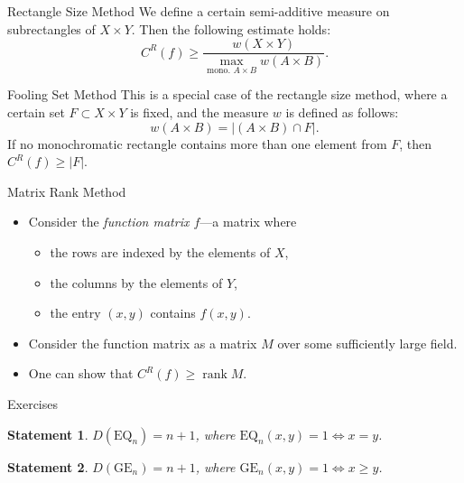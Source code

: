 \documentclass[aspectratio=169]{beamer}
\newcommand{\pitem}{\pause\item}
\newtheorem{statement}{Statement}
\DeclareMathOperator{\rank}{rank}
\begin{document}
\begin{frame}{Rectangle Size Method}
    We define a certain semi-additive measure on subrectangles of $X \times Y$. Then the following estimate holds:
    \[
    C^R(f) \ge \frac{w(X \times Y)}{\max\limits_{\text{mono. } A \times B} w(A \times B)}.
    \]

    \pause
    \begin{block}{Fooling Set Method}
        This is a special case of the rectangle size method, where a certain set $F \subset X \times Y$ is fixed, and the measure $w$ is defined as follows:
        \[
        w(A \times B) = |(A \times B) \cap F|.
        \]
        If no monochromatic rectangle contains more than one element from $F$, then $C^R(f) \ge |F|$.
    \end{block}
\end{frame}

\begin{frame}{Matrix Rank Method}
    \begin{itemize}
        \item Consider the \emph{function matrix $f$}---a matrix where
        \begin{itemize}
            \item the rows are indexed by the elements of $X$,
            \item the columns by the elements of $Y$,
            \item the entry $(x,y)$ contains $f(x,y)$.
        \end{itemize}
        \pitem Consider the function matrix as a matrix $M$ over some sufficiently large field.
        \pitem One can show that $C^R(f) \ge \rank M$.
    \end{itemize}
\end{frame}

\begin{frame}{Exercises}

\begin{statement}
    $D(\mathrm{EQ}_n) = n + 1$, where $\mathrm{EQ}_n(x,y) = 1 \iff x = y$.
\end{statement}

\pause
\begin{statement}
    $D(\mathrm{GE}_n) = n + 1$, where $\mathrm{GE}_n(x,y) = 1 \iff x \ge y$.
\end{statement}

\end{frame}
\end{document}
